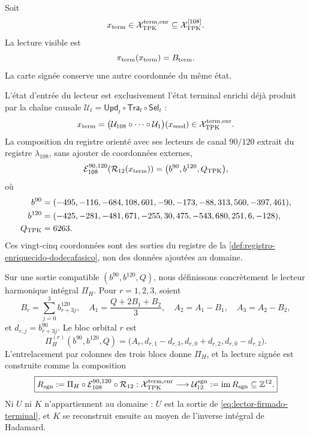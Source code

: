 Soit
\[
 x_{\rm term}\in
 \mathcal X_{\rm TPK}^{\rm term,enr}
 \subseteq\mathcal X_{\rm TPK}^{[108]}.
\]
La lecture visible est
\[
 \pi_{\rm term}(x_{\rm term})=B_{\rm term}.
\]
La carte signée conserve une autre coordonnée du même état.

\begin{definition}
\label{def:subespacio-firmado-terminal}
L'état d'entrée du lecteur est exclusivement l'état terminal enrichi déjà produit par la chaîne causale \(\mathcal U_t=\mathsf{Upd}_t\circ\mathsf{Tra}_t\circ\mathsf{Sel}_t\) :
\begin{equation}
 x_{\rm term}
 =\bigl(\mathcal U_{108}\circ\cdots\circ\mathcal U_1\bigr)
   (x_{\rm seed})
 \in\mathcal X_{\rm TPK}^{\rm term,enr}.
 \label{eq:subespacio-firmado-terminal}
\end{equation}
La composition du registre orienté avec ses lecteurs de canal \(90/120\) extrait du registre \(\lambda_{108}\), sans ajouter de coordonnées externes,
\begin{equation}
 \mathcal E_{108}^{90,120}\!\left(\mathcal R_{12}(x_{\rm term})\right)
 =\bigl(b^{90},b^{120},Q_{\rm TPK}\bigr),
 \label{eq:canales-ledger-previos-u}
\end{equation}
où
\begin{align}
 b^{90}={}&(-495,-116,-684,108,601,-90,
             -173,-88,313,560,-397,461),\notag\\
 b^{120}={}&(-425,-281,-481,671,-255,30,
              475,-543,680,251,6,-128),\notag\\
 Q_{\rm TPK}={}&6263.\notag
\end{align}
Ces vingt-cinq coordonnées sont des sorties du registre de la \cref{def:registro-enriquecido-dodecafasico}, non des données ajoutées au domaine.

Sur une sortie compatible \((b^{90},b^{120},Q)\), nous définissons concrètement le lecteur harmonique intégral \(\Pi_H\). Pour \(r=1,2,3\), soient
\begin{equation}
 B_r=\sum_{j=0}^{3}b^{120}_{r+3j},
 \quad
 A_1=\frac{Q+2B_1+B_2}{3},
 \quad A_2=A_1-B_1,
 \quad A_3=A_2-B_2,
 \label{eq:lector-armonico-a-desde-ledger}
\end{equation}
et \(d_{r,j}=b^{90}_{r+3j}\). Le bloc orbital \(r\) est
\begin{equation}
 \Pi_H^{(r)}(b^{90},b^{120},Q)
 =\bigl(A_r,d_{r,1}-d_{r,3},
              d_{r,0}+d_{r,2},d_{r,0}-d_{r,2}\bigr).
 \label{eq:lector-armonico-bloque-desde-ledger}
\end{equation}
L'entrelacement par colonnes des trois blocs donne \(\Pi_H\), et la lecture signée est construite comme la composition
\begin{equation}
 \boxed{
 R_{\rm sgn}:=
 \Pi_H\circ\mathcal E_{108}^{90,120}\circ\mathcal R_{12}:
 \mathcal X_{\rm TPK}^{\rm term,enr}
 \longrightarrow\mathcal U_{12}^{\rm sgn}:=
 \operatorname{im}R_{\rm sgn}\subseteq\mathbb Z^{12}.}
 \label{eq:lector-firmado-terminal}
\end{equation}
Ni \(U\) ni \(K\) n'appartiennent au domaine : \(U\) est la sortie de \eqref{eq:lector-firmado-terminal}, et \(K\) se reconstruit ensuite au moyen de l'inverse intégral de Hadamard.
\end{definition}

